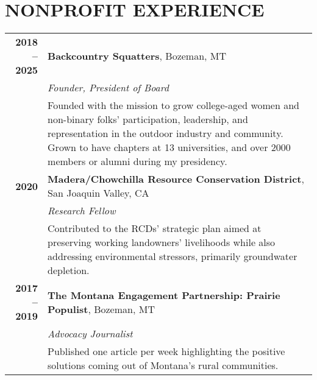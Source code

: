 \documentclass[11pt]{article}
\begin{document}
\section*{NONPROFIT EXPERIENCE}
\begin{tabularx}{\linewidth}{>{\bfseries}r X} %
2018 – 2025 & \textbf{Backcountry Squatters}, Bozeman, MT \\
    & \textit{Founder, President of Board} \\
    & Founded with the mission to grow college-aged women and non-binary folks’ participation, leadership, and representation in the outdoor industry and community. Grown to have chapters at 13 universities, and over 2000 members or alumni during my presidency. \\
2020 & \textbf{Madera/Chowchilla Resource Conservation District}, San Joaquin Valley, CA \\
    & \textit{Research Fellow}\\
    & Contributed to the RCDs’ strategic plan aimed at preserving working landowners’ livelihoods while also addressing environmental stressors, primarily groundwater depletion. \\
2017 – 2019 & \textbf{The Montana Engagement Partnership: Prairie Populist}, Bozeman, MT \\
    & \textit{Advocacy Journalist} \\
    & Published one article per week highlighting the positive solutions coming out of Montana’s rural communities. \\[1ex]
\end{tabularx}
\end{document}
